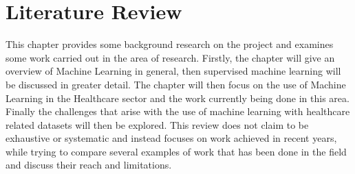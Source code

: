 \chapter{Literature Review}\label{ch:Background}

This chapter provides some background research on the project and examines some work carried out in the area of research. Firstly, the chapter will give an overview of Machine Learning in general, then supervised machine learning will be discussed in greater detail. The chapter will then focus on the use of Machine Learning in the Healthcare sector and the work currently being done in this area. Finally the challenges that arise with the use of machine learning with healthcare related datasets will then be explored. This review does not claim to be exhaustive or systematic and instead focuses on work achieved in recent years, while trying to compare several examples of work that has been done in the field and discuss their reach and limitations.

